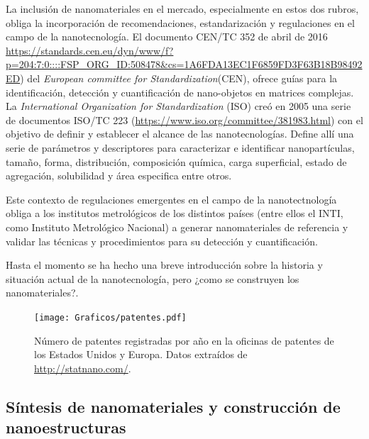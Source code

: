  	 La inclusión de nanomateriales en el mercado, especialmente en estos dos rubros, obliga la incorporación de recomendaciones, estandarización y regulaciones en el campo de la nanotecnología. El\hspace{1pt} documento\hspace{1pt} CEN/TC\hspace{1pt} 352 de abril de 2016 \url{https://standards.cen.eu/dyn/www/f?p=204:7:0::::FSP_ORG_ID:508478&cs=1A6FDA13EC1F6859FD3F63B18B98492ED})
 	 del \textit{European committee for Standardization}(CEN), ofrece guías para la identificación, detección y cuantificación de nano-objetos en matrices complejas. La \textit{International Organization for Standardization} (ISO) creó en 2005 una serie de documentos ISO/TC 223 (\url{https://www.iso.org/committee/381983.html}) con el objetivo de definir y establecer el alcance de las nanotecnologías. Define allí una serie de parámetros y descriptores para caracterizar e identificar nanopartículas, tamaño, forma, distribución, composición química, carga superficial, estado de agregación, solubilidad y área especifica entre otros.

 	 Este contexto de regulaciones emergentes en el campo de la nanotectnología obliga a los institutos metrológicos de los distintos países (entre ellos el INTI, como Instituto Metrológico Nacional) a generar nanomateriales de referencia y validar las técnicas y procedimientos para su detección y cuantificación.

 	 Hasta el momento se ha hecho una breve introducción sobre la historia y situación actual de la nanotecnología, pero ¿como se construyen los nanomateriales?.


		\begin{figure}[h!]
 			\begin{center}
 			\texttt{[image: Graficos/patentes.pdf]}
 			\vspace*{-0.3cm}
 			\caption[Número de patentes de productos en base nanotecnológica]{Número de patentes registradas por año en la oficinas de patentes de los Estados Unidos y Europa. Datos extraídos de \url{http://statnano.com/}.}
 			\label{fig:patentes}
 		    \end{center}
 		    \end{figure}

 	\vspace*{-0.6cm}\subsection{Síntesis de nanomateriales y construcción de nanoestructuras}

